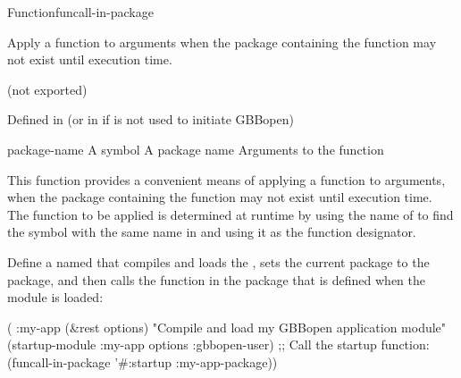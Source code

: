 \documentclass[10pt,twoside,english,pdftex]{article}
\begin{document}
\begin{functiondoc}{Function}{funcall-in-package}%
  {
    }
%
%

\fnsyntax 

\fnpurpose Apply a function to arguments when the package containing the
function may not exist until execution time.

\fnpackage {} (not exported)

\fnmodule Defined in  (or in
 if  is not used to
initiate GBBopen)

\fnargs
\begin{args}{package-name}
\arg[symbol] A symbol
 A package name
\arg[args] Arguments to the function
\end{args}

\fndescription This function provides a convenient means of applying a
function to arguments, when the package containing the function may not exist
until execution time. The function to be applied is determined at runtime by
using the name of  to find the symbol with the same name in
 and using it as the function designator.

\fnexample
{}%
%
Define a  named  that compiles and
loads the  , sets the current package to
the  package, and then calls the function
 in the package  that is
defined when the  module is loaded:
%
\W\supp
\begin{example}
  ( :my-app (&rest options)
    "Compile and load my GBBopen application module"
    (startup-module :my-app options :gbbopen-user)
    ;; Call the startup function:
    (funcall-in-package '#:startup :my-app-package))
\end{example} 

\end{functiondoc}

\end{document}
